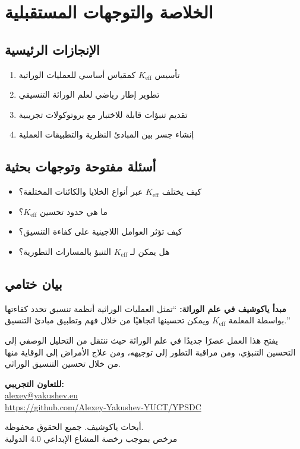 \documentclass[11pt,a4paper]{article}
\begin{document}
	\section{الخلاصة والتوجهات المستقبلية}
	
	\subsection{الإنجازات الرئيسية}
	
	\begin{enumerate}
		\item تأسيس \(K_{\text{eff}}\) كمقياس أساسي للعمليات الوراثية
		\item تطوير إطار رياضي لعلم الوراثة التنسيقي
		\item تقديم تنبؤات قابلة للاختبار مع بروتوكولات تجريبية
		\item إنشاء جسر بين المبادئ النظرية والتطبيقات العملية
	\end{enumerate}
	
	\subsection{أسئلة مفتوحة وتوجهات بحثية}
	
	\begin{itemize}
		\item كيف يختلف \(K_{\text{eff}}\) عبر أنواع الخلايا والكائنات المختلفة؟
		\item ما هي حدود تحسين \(K_{\text{eff}}\)؟
		\item كيف تؤثر العوامل اللاجينية على كفاءة التنسيق؟
		\item هل يمكن لـ \(K_{\text{eff}}\) التنبؤ بالمسارات التطورية؟
	\end{itemize}
	
	\subsection{بيان ختامي}
	
	\textbf{مبدأ ياكوشيف في علم الوراثة:}
	``تمثل العمليات الوراثية أنظمة تنسيق تحدد كفاءتها بواسطة المعلمة \(K_{\text{eff}}\) ويمكن تحسينها اتجاهيًا من خلال فهم وتطبيق مبادئ التنسيق.''
	
	يفتح هذا العمل عصرًا جديدًا في علم الوراثة حيث ننتقل من التحليل الوصفي إلى التحسين التنبؤي، ومن مراقبة التطور إلى توجيهه، ومن علاج الأمراض إلى الوقاية منها من خلال تحسين التنسيق الوراثي.
	
	\begin{center}
		\vspace{1cm}
		\textbf{للتعاون التجريبي:}\\
		\url{alexey@yakushev.eu}\\
		\url{https://github.com/Alexey-Yakushev-YUCT/YPSDC}
		
		\vspace{0.5cm}
		 أبحاث ياكوشيف. جميع الحقوق محفوظة.\\
		مرخص بموجب رخصة المشاع الإبداعي 4.0 الدولية
	\end{center}
	
\end{document}
